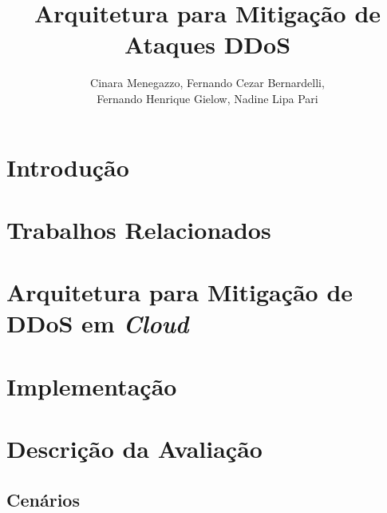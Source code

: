 \documentclass[a4paper, 12pt]{article}
\begin{document}
\title{Arquitetura para Mitigação de Ataques DDoS}

\author{
Cinara Menegazzo,
Fernando Cezar Bernardelli, \\
Fernando Henrique Gielow,
Nadine Lipa Pari
}
   

   
\address{Departamento de Informática -- Universidade Federal do Paraná\\
NR2 - Núcleo de Redes Sem Fio e Redes Avançadas\\
  Caixa Postal 19.081 -- 81.531-980 -- Curitiba -- PR -- Brasil
}     

\maketitle


\begin{resumo}

\end{resumo}



\section{Introdução}



\section{Trabalhos Relacionados}

 



\section{Arquitetura para Mitigação de DDoS em \emph{Cloud}}



\section{Implementação}


\section{Descrição da Avaliação}


\subsection{Cenários}

\end{document}
